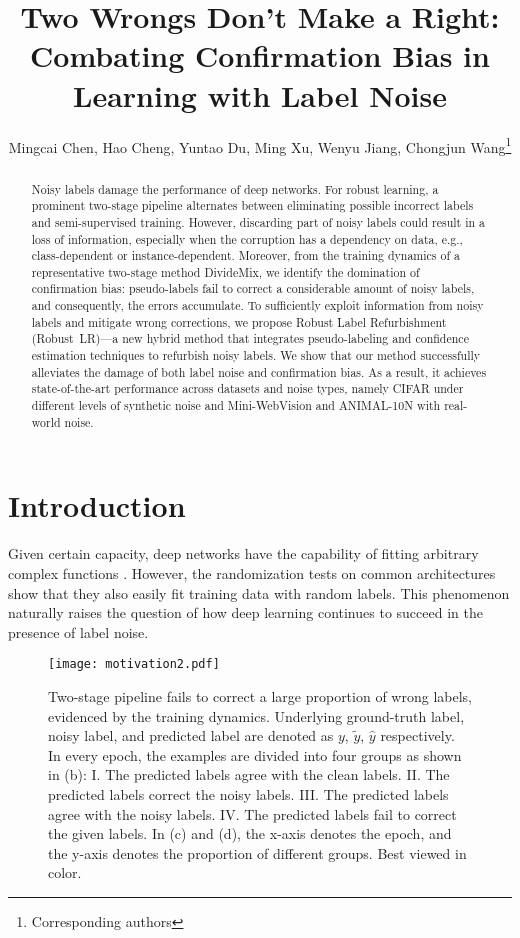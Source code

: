 \documentclass[letterpaper]{article} \usepackage{aaai23}  \usepackage{times}  \usepackage{helvet}  \usepackage{courier}  \usepackage[hyphens]{url}  \usepackage{graphicx} \urlstyle{rm} \def\UrlFont{\rm}  \usepackage{natbib}  \usepackage{caption} \frenchspacing  \setlength{\pdfpagewidth}{8.5in} \setlength{\pdfpageheight}{11in} \usepackage{algorithm}
\title{Two Wrongs Don't Make a Right: \\ Combating Confirmation Bias in Learning with Label Noise}
\author{
  Mingcai Chen, Hao Cheng, Yuntao Du, Ming Xu, Wenyu Jiang, Chongjun Wang\thanks{Corresponding authors}\\
}
\begin{document}
\maketitle
\begin{abstract}
    Noisy labels damage the performance of deep networks. 
    For robust learning, a prominent two-stage pipeline alternates between eliminating possible incorrect labels and semi-supervised training.
    However, discarding part of noisy labels could result in a loss of information, especially when the corruption has a dependency on data, e.g., class-dependent or instance-dependent.
    Moreover, from the training dynamics of a representative two-stage method DivideMix, we identify the domination of confirmation bias: pseudo-labels fail to correct a considerable amount of noisy labels, and consequently, the errors accumulate.
    To sufficiently exploit information from noisy labels and mitigate wrong corrections, we propose Robust Label Refurbishment (Robust~LR)---a new hybrid method that integrates pseudo-labeling and confidence estimation techniques to refurbish noisy labels.
    We show that our method successfully alleviates the damage of both label noise and confirmation bias.
    As a result, it achieves state-of-the-art performance across datasets and noise types, namely CIFAR under different levels of synthetic noise and Mini-WebVision and ANIMAL-10N with real-world noise. 
\end{abstract}


\section{Introduction}
Given certain capacity, deep networks have the capability of fitting arbitrary complex functions \cite{cybenko1989approximation}. 
However, the randomization tests on common architectures \cite{edgington2007randomization,zhang2016understanding,arpit2017closer} show that they also easily fit training data with random labels.
This phenomenon naturally raises the question of how deep learning continues to succeed in the presence of label noise.

\begin{figure*}[t] 
    \centering
    \texttt{[image: motivation2.pdf]} 
    \caption{
    Two-stage pipeline fails to correct a large proportion of wrong labels, evidenced by the training dynamics.
    Underlying ground-truth label, noisy label, and predicted label are denoted as $y$, $\tilde{y}$, $\hat{y}$ respectively.
    In every epoch, the examples are divided into four groups as shown in (b):
    I. The predicted labels agree with the clean labels. II. The predicted labels correct the noisy labels. III. The predicted labels agree with the noisy labels. IV. The predicted labels fail to correct the given labels. In (c) and (d), the x-axis denotes the epoch, and the y-axis denotes the proportion of different groups.
    Best viewed in color.
    }
    \label{motivation}
\end{figure*}
\end{document}
